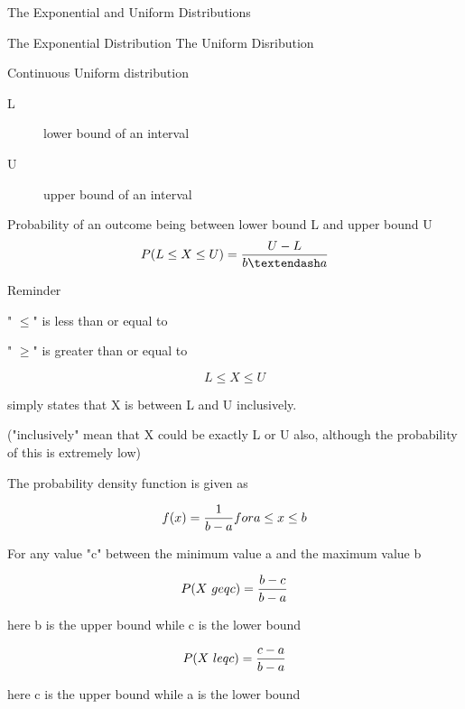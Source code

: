 \documentclass[12pt, a4paper]{report}
\author{ } \date{ }
\theoremstyle{definition}
\theoremstyle{remark}
\begin{document}
	
	The Exponential and Uniform Distributions
	
	The Exponential Distribution
	The Uniform Disribution
	
	
	Continuous Uniform distribution
	
	\begin{description}
		\item[L] lower bound of an interval
		\item[U] upper bound of an interval
	\end{description}
	Probability of an outcome being between lower bound L and upper bound U
	\[P( L \leq X \leq U)  =  { U - L \over  b – a }\]
	
	
	
	Reminder
	
	" $\leq$" is less than or equal to
	
	" $\geq$" is greater than or equal to
	
	
	\[L \leq X \leq U\]
	
	simply states that X is between L and U inclusively.
	
	("inclusively" mean that X could be exactly L or U also, although the probability of this is extremely low)
	
	
	
	The probability density function is given as
	
	\[f(x) = {1 \over b-a} for a \leq x \leq b\]
	
	For any value "c" between the minimum value a and the maximum value b
	
	\[P(X \ geq c) = {b-c \over b-a}\]
	
	here b is the upper bound while c is the lower bound
	
	
	\[P(X \ leq c) = {c-a \over b-a}\]
	
	here c is the upper bound while a is the lower bound
	
	
\end{document}
